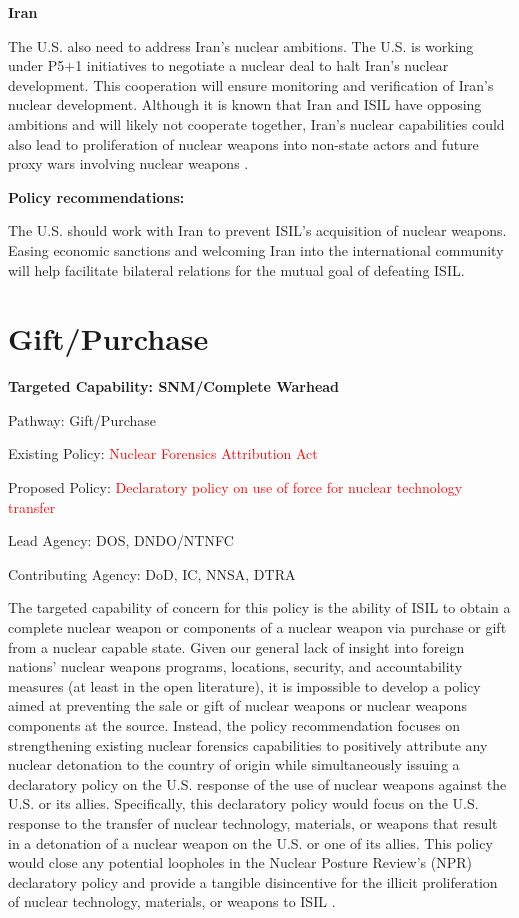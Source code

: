 \documentclass{report}
\begin{document}
\textbf{Iran}

The U.S. also need to address Iran's nuclear ambitions.  The U.S. is working under P5+1 initiatives to negotiate a nuclear deal to halt Iran's nuclear development. This cooperation will ensure monitoring and verification of Iran's nuclear development. Although it is known that Iran and ISIL have opposing ambitions and will likely not cooperate together, Iran's nuclear capabilities could also lead to proliferation of nuclear weapons into non-state actors and future proxy wars involving nuclear weapons \cite{Pfarrer2014}.

\textbf{Policy recommendations:}

The U.S. should work with Iran to prevent ISIL's acquisition of nuclear weapons. Easing economic sanctions and welcoming Iran into the international community will help facilitate bilateral relations for the mutual goal of defeating ISIL.  
 

 







\section{Gift/Purchase} \label{sec:purchase_gift}



\bfseries Targeted Capability: SNM/Complete Warhead

Pathway: Gift/Purchase

Existing Policy: \textcolor{red}{Nuclear Forensics Attribution Act}

Proposed Policy: \textcolor{red}{Declaratory policy on use of force for nuclear technology transfer}

Lead Agency: DOS, DNDO/NTNFC

Contributing Agency: DoD, IC, NNSA, DTRA \normalfont

The targeted capability of concern for this policy is the ability of ISIL to obtain a complete nuclear weapon or components of a nuclear weapon via purchase or gift from a nuclear capable state.  Given our general lack of insight into foreign nations' nuclear weapons programs, locations, security, and accountability measures (at least in the open literature), it is impossible to develop a policy aimed at preventing the sale or gift of nuclear weapons or nuclear weapons components at the source.  Instead, the policy recommendation focuses on strengthening existing nuclear forensics capabilities to positively attribute any nuclear detonation to the country of origin while simultaneously issuing a declaratory policy on the U.S. response of the use of nuclear weapons against the U.S. or its allies.  Specifically, this declaratory policy would focus on the U.S. response to the transfer of nuclear technology, materials, or weapons that result in a detonation of a nuclear weapon on the U.S. or one of its allies.  This policy would close any potential loopholes in the Nuclear Posture Review's (NPR) declaratory policy and provide a tangible disincentive for the illicit proliferation of nuclear technology, materials, or weapons to ISIL \cite{U.S.DepartmentofDefense2010}.  
\end{document}

